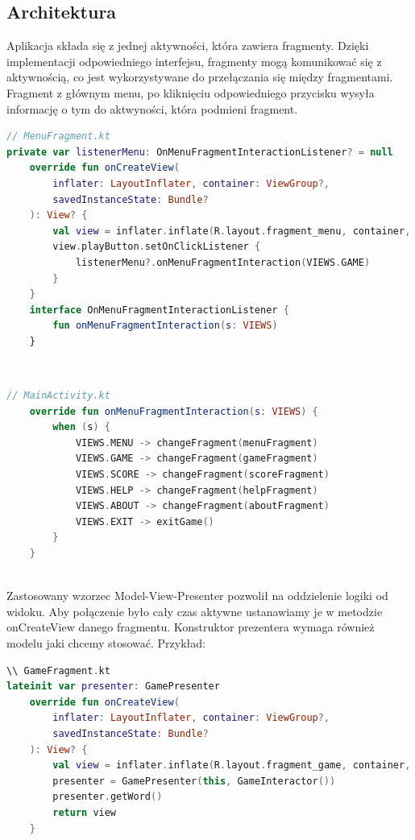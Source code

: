 \documentclass[12pt,a4paper]{article}
\begin{document}
\subsection{Architektura}
Aplikacja składa się z jednej aktywności, która zawiera fragmenty. Dzięki implementacji odpowiedniego interfejsu, fragmenty mogą komunikować się z aktywnością, co jest wykorzystywane do przełączania się między fragmentami. Fragment z głównym menu, po kliknięciu odpowiedniego przycisku wysyła informację o tym do aktwyności, która podmieni fragment.\\
\begin{lstlisting}[caption={Interfejs oraz wywołanie akcji w fragmencie}, label={lst:example1}, language=Kotlin]
// MenuFragment.kt
private var listenerMenu: OnMenuFragmentInteractionListener? = null
    override fun onCreateView(
        inflater: LayoutInflater, container: ViewGroup?,
        savedInstanceState: Bundle?
    ): View? {
        val view = inflater.inflate(R.layout.fragment_menu, container, false)
        view.playButton.setOnClickListener {
            listenerMenu?.onMenuFragmentInteraction(VIEWS.GAME)
        }
    }
    interface OnMenuFragmentInteractionListener {
        fun onMenuFragmentInteraction(s: VIEWS)
    }
\end{lstlisting}\\
\begin{lstlisting}[caption={Implementacja w aktywności}, label={lst:example2}, language=Kotlin]
// MainActivity.kt
    override fun onMenuFragmentInteraction(s: VIEWS) {
        when (s) {
            VIEWS.MENU -> changeFragment(menuFragment)
            VIEWS.GAME -> changeFragment(gameFragment)
            VIEWS.SCORE -> changeFragment(scoreFragment)
            VIEWS.HELP -> changeFragment(helpFragment)
            VIEWS.ABOUT -> changeFragment(aboutFragment)
            VIEWS.EXIT -> exitGame()
        }
    }
\end{lstlisting}\\
Zastosowany wzorzec Model-View-Presenter pozwolił na oddzielenie logiki od widoku. Aby połączenie było cały czas aktywne ustanawiamy je w metodzie onCreateView danego fragmentu. Konstruktor prezentera wymaga również modelu jaki chcemy stosować. Przykład:\\
\begin{lstlisting}[caption={Połączenie fragmentu z prezenterem}, label={lst:example3}, language=Kotlin]
\\ GameFragment.kt
lateinit var presenter: GamePresenter
    override fun onCreateView(
        inflater: LayoutInflater, container: ViewGroup?,
        savedInstanceState: Bundle?
    ): View? {
        val view = inflater.inflate(R.layout.fragment_game, container, false)
        presenter = GamePresenter(this, GameInteractor())
        presenter.getWord()
        return view
    }
\end{lstlisting}\\
\end{document}
